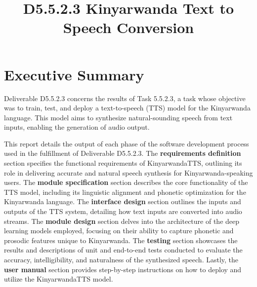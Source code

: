 \documentclass{CSSRforAfrica}
\begin{document}



\title{D5.5.2.3 Kinyarwanda Text to Speech Conversion}    

\partner{}                                %



\maketitle
 

\section*{Executive Summary}
\label{executive_summary}

Deliverable D5.5.2.3 concerns the results of Task 5.5.2.3, a task whose objective was to train, test, and deploy a text-to-speech (TTS) model for the Kinyarwanda language. This model aims to synthesize natural-sounding speech from text inputs, enabling the generation of audio output.  

This report details the output of each phase of the software development process used in the fulfillment of Deliverable D5.5.2.3. The \textbf{requirements definition} section specifies the functional requirements of KinyarwandaTTS, outlining its role in delivering accurate and natural speech synthesis for Kinyarwanda-speaking users. The \textbf{module specification} section describes the core functionality of the TTS model, including its linguistic alignment and phonetic optimization for the Kinyarwanda language. The \textbf{interface design} section outlines the inputs and outputs of the TTS system, detailing how text inputs are converted into audio streams. The \textbf{module design} section delves into the architecture of the deep learning models employed, focusing on their ability to capture phonetic and prosodic features unique to Kinyarwanda. The \textbf{testing} section showcases the results and descriptions of unit and end-to-end tests conducted to evaluate the accuracy, intelligibility, and naturalness of the synthesized speech. Lastly, the \textbf{user manual} section provides step-by-step instructions on how to deploy and utilize the KinyarwandaTTS model.  
\end{document}
